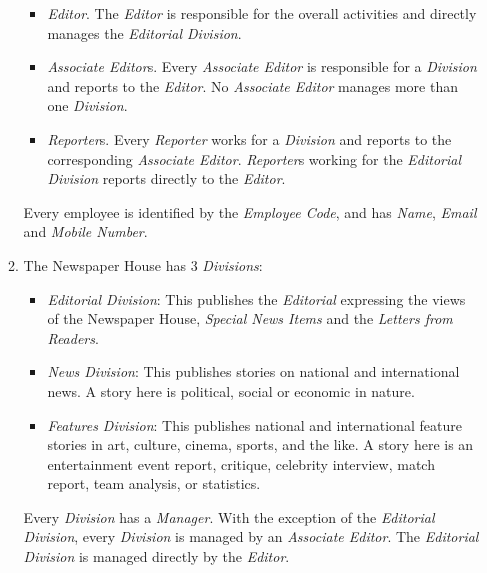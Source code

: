 \documentclass{article}
\begin{document}
\begin{enumerate}
\begin{enumerate}
\begin{itemize}
\item {\em Editor}. The {\em Editor} is responsible for the overall activities and directly manages the {\em Editorial Division}. 
\item {\em Associate Editor}s. Every {\em Associate Editor} is responsible for a {\em Division} and reports to the {\em Editor}. No {\em Associate Editor} manages more than one {\em Division}.
\item {\em Reporter}s. Every {\em Reporter} works for a {\em Division} and reports to the corresponding {\em Associate Editor}. {\em Reporter}s working for the {\em Editorial Division} reports directly to the {\em Editor}.
\end{itemize}

Every employee is identified by the {\em Employee Code}, and has {\em Name}, {\em Email} and {\em Mobile Number}.

\item The \textsf{Newspaper House} has 3 {\em Divisions}:

\begin{itemize}
\item {\em Editorial Division}: This publishes the {\em Editorial} expressing the views of the \textsf{Newspaper House}, {\em Special News Items} and the {\em Letters from Readers}. 
\item {\em News Division}: This publishes stories on national and international news. A story here is political, social or economic in nature. 
\item {\em Features Division}: This publishes national and international feature stories in art, culture, cinema, sports, and the like. A story here is an entertainment event report, critique, celebrity interview, match report, team analysis, or statistics.
\end{itemize}

Every {\em Division} has a {\em Manager}. With the exception of the {\em Editorial Division}, every {\em Division} is managed by an {\em Associate Editor}. The {\em Editorial Division} is managed directly by the {\em Editor}. 


\end{enumerate}
\end{enumerate}
\end{document}
